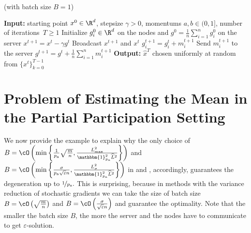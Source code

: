 \documentclass{article}
\newcommand{\algorithmname}{DASHA-PP}
\newcommand*{\probavailable}{\ensuremath{p_{\textnormal{a}}}}
\begin{document}
\begin{algorithm*}
  \caption{ (with batch size $B = 1$)}
  \label{alg:main_algorithm_dasha_mvr}
  \begin{algorithmic}[1]
  \STATE \textbf{Input:} starting point $x^0 \in \R^d$, stepsize $\gamma > 0$, momentums $a, b \in (0, 1]$, 
  number of iterations~$T \geq 1$
  \STATE Initialize $g^0_i\in \R^d$ on the nodes and  $g^0 = \frac{1}{n}\sum_{i=1}^n g^0_i$ on the server
  \STATE $x^{t+1} = x^t - \gamma g^t$
  \STATE Broadcast $x^{t+1}$ and $x^{t}$
  \STATE $g^{t+1}_i = g^{t}_i + m^{t+1}_i$
  \STATE Send $m^{t+1}_i$ to the server
  \ENDFOR
  \STATE $g^{t+1} = g^t + \frac{1}{n} \sum_{i=1}^n m^{t+1}_i$
  \ENDFOR
  \STATE \textbf{Output:} $\hat{x}^T$ chosen uniformly at random from $\{x^t\}_{k=0}^{T-1}$ 
  \end{algorithmic}
\end{algorithm*}

\newpage

\section{Problem of Estimating the Mean in the Partial Participation Setting}
\label{sec:partial_participation_sampling}
We now provide the example to explain why the only choice of $B = \cO\left(\min\left\{\frac{1}{\probavailable}\sqrt{\frac{m}{n}},\frac{L_{\max}^2}{\mathbbm{1}_{\probavailable}^2 \widehat{L}^2}\right\}\right)$ and $B = \cO\left(\min\left\{\frac{\sigma}{\probavailable \sqrt{\varepsilon} n}, \frac{L_{\sigma}^2}{\mathbbm{1}_{\probavailable}^2 \widehat{L}^2}\right\}\right)$ in \algname{\algorithmname-PAGE} and \algname{\algorithmname-MVR}, accordingly, guarantees the degeneration up to $\nicefrac{1}{\probavailable}.$ This is surprising, because in methods with the variance reduction of stochastic gradients \citep{PAGE, tyurin2022dasha} we can take the size of batch size $B = \cO\left(\sqrt{\frac{m}{n}}\right)$ and $B = \cO\left(\frac{\sigma}{\sqrt{\varepsilon} n}\right)$ and guarantee the optimality. Note that the smaller the batch size $B$, the more the server and the nodes have to communicate to get $\varepsilon$-solution.
\end{document}
